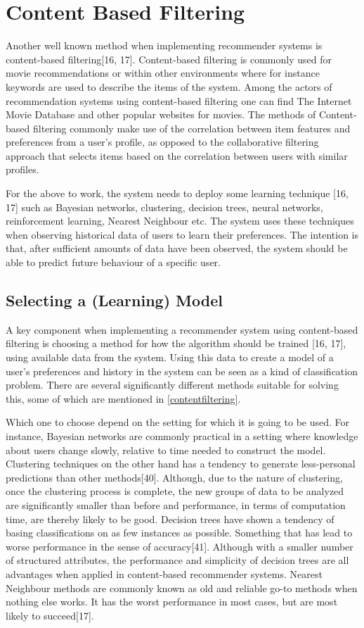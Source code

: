\section{Content Based Filtering}\label{contentfiltering}
Another well known method when implementing recommender systems is content-based filtering[16, 17]. Content-based filtering is commonly used for movie recommendations or within other environments where for instance keywords are used to describe the items of the system. Among the actors of recommendation systems using content-based filtering one can find The Internet Movie Database and other popular websites for movies. The methods of Content-based filtering commonly make use of the correlation between item features and preferences from a user’s profile, as opposed to the collaborative filtering approach that selects items based on the correlation between users with similar profiles. 

For the above to work, the system needs to deploy some learning technique [16, 17] such as Bayesian networks, clustering, decision trees, neural networks, reinforcement learning, Nearest Neighbour etc. The system uses these techniques when observing historical data of users to learn their preferences. The intention is that, after sufficient amounts of data have been observed, the system should be able to predict future behaviour of a specific user.


\subsection{Selecting a (Learning) Model}\label{trainingmodel}
A key component when implementing a recommender system using content-based filtering is choosing a method for how the algorithm should be trained [16, 17], using available data from the system. Using this data to create a model of a user’s preferences and history in the system can be seen as a kind of classification problem. There are several significantly different methods suitable for solving this, some of which are mentioned in \autoref{contentfiltering}.

Which one to choose depend on the setting for which it is going to be used. For instance, Bayesian networks are commonly practical in a setting where knowledge about users change slowly, relative to time needed to construct the model. Clustering techniques on the other hand has a tendency to generate less-personal predictions than other methods[40]. Although, due to the nature of clustering, once the clustering process is complete, the new groups of data to be analyzed are significantly smaller than before and performance, in terms of computation time, are thereby likely to be good. Decision trees have shown a tendency of basing classifications on as few instances as possible. Something that has lead to worse performance in the sense of accuracy[41]. Although with a smaller number of structured attributes, the performance and simplicity of decision trees are all advantages when applied in content-based recommender systems. Nearest Neighbour methods are commonly known as old and reliable go-to methods when nothing else works. It has the worst performance in most cases, but are most likely to succeed[17].

